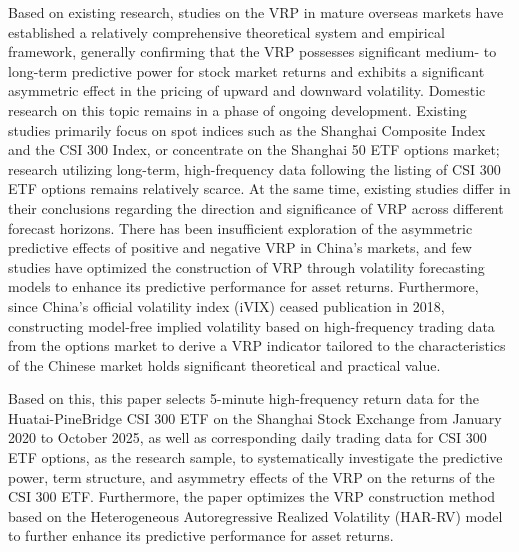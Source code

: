 \documentclass[a4paper, 12pt]{article}    %
\begin{document}
Based on existing research, studies on the VRP in mature overseas markets have established a relatively comprehensive theoretical system and empirical framework, generally confirming that the VRP possesses significant medium- to long-term predictive power for stock market returns and exhibits a significant asymmetric effect in the pricing of upward and downward volatility. Domestic research on this topic remains in a phase of ongoing development. Existing studies primarily focus on spot indices such as the Shanghai Composite Index and the CSI 300 Index, or concentrate on the Shanghai 50 ETF options market; research utilizing long-term, high-frequency data following the listing of CSI 300 ETF options remains relatively scarce. At the same time, existing studies differ in their conclusions regarding the direction and significance of VRP across different forecast horizons. There has been insufficient exploration of the asymmetric predictive effects of positive and negative VRP in China’s markets, and few studies have optimized the construction of VRP through volatility forecasting models to enhance its predictive performance for asset returns. Furthermore, since China’s official volatility index (iVIX) ceased publication in 2018, constructing model-free implied volatility based on high-frequency trading data from the options market to derive a VRP indicator tailored to the characteristics of the Chinese market holds significant theoretical and practical value.

Based on this, this paper selects 5-minute high-frequency return data for the Huatai-PineBridge CSI 300 ETF on the Shanghai Stock Exchange from January 2020 to October 2025, as well as corresponding daily trading data for CSI 300 ETF options, as the research sample, to systematically investigate the predictive power, term structure, and asymmetry effects of the VRP on the returns of the CSI 300 ETF. Furthermore, the paper optimizes the VRP construction method based on the Heterogeneous Autoregressive Realized Volatility (HAR-RV) model to further enhance its predictive performance for asset returns.
\end{document}
